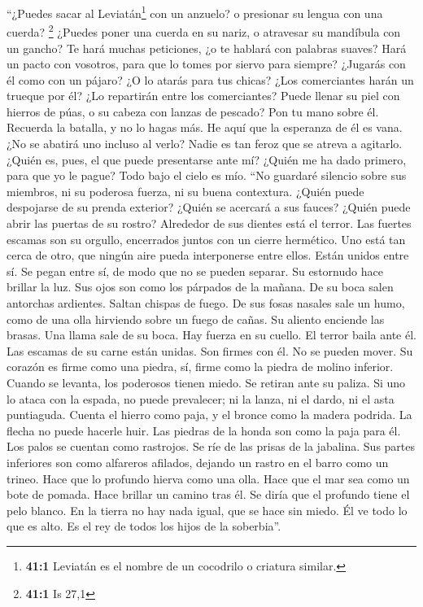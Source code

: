 \begin{paracol}{2}
 ``¿Puedes sacar al Leviatán\footnote{\textbf{41:1}
  Leviatán es el nombre de un cocodrilo o criatura similar.} con un
anzuelo? o presionar su lengua con una cuerda? \footnote{\textbf{41:1}
  Is 27,1}  ¿Puedes poner una cuerda en su nariz, o
atravesar su mandíbula con un gancho?  Te hará muchas
peticiones, ¿o te hablará con palabras suaves?  Hará un
pacto con vosotros, para que lo tomes por siervo para siempre?
 ¿Jugarás con él como con un pájaro? ¿O lo atarás para tus
chicas?  ¿Los comerciantes harán un trueque por él? ¿Lo
repartirán entre los comerciantes?  Puede llenar su piel
con hierros de púas, o su cabeza con lanzas de pescado? 
Pon tu mano sobre él. Recuerda la batalla, y no lo hagas más.
 He aquí que la esperanza de él es vana. ¿No se abatirá
uno incluso al verlo?  Nadie es tan feroz que se atreva a
agitarlo. ¿Quién es, pues, el que puede presentarse ante mí?
 ¿Quién me ha dado primero, para que yo le pague? Todo
bajo el cielo es mío.  ``No guardaré silencio sobre sus
miembros, ni su poderosa fuerza, ni su buena contextura. 
¿Quién puede despojarse de su prenda exterior? ¿Quién se acercará a sus
fauces?  ¿Quién puede abrir las puertas de su rostro?
Alrededor de sus dientes está el terror.  Las fuertes
escamas son su orgullo, encerrados juntos con un cierre hermético.
 Uno está tan cerca de otro, que ningún aire pueda
interponerse entre ellos.  Están unidos entre sí. Se
pegan entre sí, de modo que no se pueden separar.  Su
estornudo hace brillar la luz. Sus ojos son como los párpados de la
mañana.  De su boca salen antorchas ardientes. Saltan
chispas de fuego.  De sus fosas nasales sale un humo,
como de una olla hirviendo sobre un fuego de cañas.  Su
aliento enciende las brasas. Una llama sale de su boca. 
Hay fuerza en su cuello. El terror baila ante él.  Las
escamas de su carne están unidas. Son firmes con él. No se pueden mover.
 Su corazón es firme como una piedra, sí, firme como la
piedra de molino inferior.  Cuando se levanta, los
poderosos tienen miedo. Se retiran ante su paliza.  Si
uno lo ataca con la espada, no puede prevalecer; ni la lanza, ni el
dardo, ni el asta puntiaguda.  Cuenta el hierro como
paja, y el bronce como la madera podrida.  La flecha no
puede hacerle huir. Las piedras de la honda son como la paja para él.
 Los palos se cuentan como rastrojos. Se ríe de las
prisas de la jabalina.  Sus partes inferiores son como
alfareros afilados, dejando un rastro en el barro como un trineo.
 Hace que lo profundo hierva como una olla. Hace que el
mar sea como un bote de pomada.  Hace brillar un camino
tras él. Se diría que el profundo tiene el pelo blanco. 
En la tierra no hay nada igual, que se hace sin miedo. 
Él ve todo lo que es alto. Es el rey de todos los hijos de la
soberbia''.


\end{paracol}

